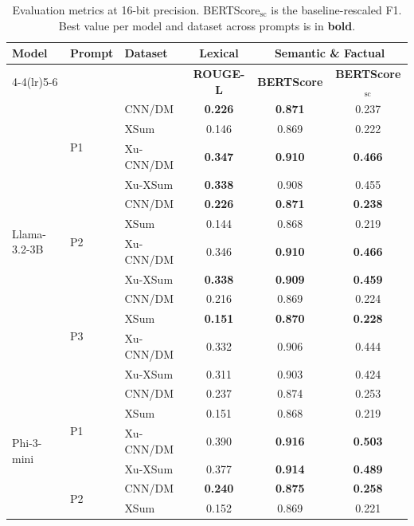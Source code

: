 \begin{table}[H]
\centering
\footnotesize
\setlength{\tabcolsep}{4pt}
\caption{Evaluation metrics at 16-bit precision. BERTScore$_{\mathrm{sc}}$ is the baseline-rescaled F1. Best value per model and dataset across prompts is in \textbf{bold}.}
\label{tab:eval-16bit}
\begin{tabular}{lllccc}
\toprule
\multirow{2}{*}{\textbf{Model}} & \multirow{2}{*}{\textbf{Prompt}} & \multirow{2}{*}{\textbf{Dataset}} & \textbf{Lexical} & \multicolumn{2}{c}{\textbf{Semantic \& Factual}} \\
\cmidrule(lr){4-4}\cmidrule(lr){5-6}
 & & & \textbf{ROUGE-L} & \textbf{BERTScore} & \textbf{BERTScore$_{\mathrm{sc}}$} \\
\midrule
\multirow{12}{*}{Llama-3.2-3B} & \multirow{4}{*}{P1} & CNN/DM & \textbf{0.226} & \textbf{0.871} & 0.237 \\
 &  & XSum & 0.146 & 0.869 & 0.222 \\
 &  & Xu-CNN/DM & \textbf{0.347} & \textbf{0.910} & \textbf{0.466} \\
 &  & Xu-XSum & \textbf{0.338} & 0.908 & 0.455 \\
\cmidrule(lr){2-6}
 & \multirow{4}{*}{P2} & CNN/DM & \textbf{0.226} & \textbf{0.871} & \textbf{0.238} \\
 &  & XSum & 0.144 & 0.868 & 0.219 \\
 &  & Xu-CNN/DM & 0.346 & \textbf{0.910} & \textbf{0.466} \\
 &  & Xu-XSum & \textbf{0.338} & \textbf{0.909} & \textbf{0.459} \\
\cmidrule(lr){2-6}
 & \multirow{4}{*}{P3} & CNN/DM & 0.216 & 0.869 & 0.224 \\
 &  & XSum & \textbf{0.151} & \textbf{0.870} & \textbf{0.228} \\
 &  & Xu-CNN/DM & 0.332 & 0.906 & 0.444 \\
 &  & Xu-XSum & 0.311 & 0.903 & 0.424 \\
\midrule
\multirow{12}{*}{Phi-3-mini} & \multirow{4}{*}{P1} & CNN/DM & 0.237 & 0.874 & 0.253 \\
 &  & XSum & 0.151 & 0.868 & 0.219 \\
 &  & Xu-CNN/DM & 0.390 & \textbf{0.916} & \textbf{0.503} \\
 &  & Xu-XSum & 0.377 & \textbf{0.914} & \textbf{0.489} \\
\cmidrule(lr){2-6}
 & \multirow{4}{*}{P2} & CNN/DM & \textbf{0.240} & \textbf{0.875} & \textbf{0.258} \\
 &  & XSum & 0.152 & 0.869 & 0.221 \\

\end{tabular}
\end{table}
